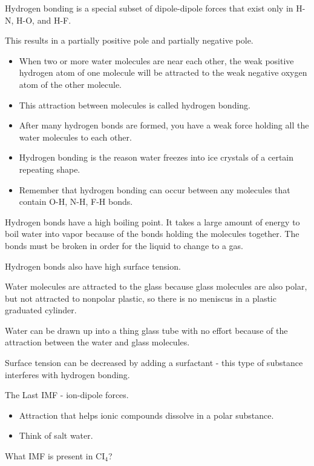 \documentclass[../hchem.tex]{subfiles}
\begin{document}
Hydrogen bonding is a special subset of dipole-dipole forces that exist only in H-N, H-O, and H-F.

This results in a partially positive pole and partially negative pole.

\begin{itemize}
    \item When two or more water molecules are near each other, the weak positive hydrogen atom of one molecule will be attracted to the weak negative oxygen atom of the other molecule.
    \item This attraction between molecules is called hydrogen bonding.
    \item After many hydrogen bonds are formed, you have a weak force holding all the water molecules to each other.
    \item Hydrogen bonding is the reason water freezes into ice crystals of a certain repeating shape.
    \item Remember that hydrogen bonding can occur between any molecules that contain O-H, N-H, F-H bonds.
\end{itemize}
Hydrogen bonds have a high boiling point. It takes a large amount of energy to boil water into vapor because of the bonds holding the molecules together.
The bonds must be broken in order for the liquid to change to a gas.

Hydrogen bonds also have high surface tension.

Water molecules are attracted to the glass because glass molecules are also polar, but not attracted to nonpolar plastic, so there is no meniscus in a plastic graduated cylinder.

Water can be drawn up into a thing glass tube with no effort because of the attraction between the water and glass molecules.

Surface tension can be decreased by adding a surfactant - this type of substance interferes with hydrogen bonding.

The Last IMF - ion-dipole forces.
\begin{itemize}
    \item Attraction that helps ionic compounds dissolve in a polar substance.
    \item Think of salt water.
\end{itemize}

\ex What IMF is present in CI$_4$?
\end{document}
